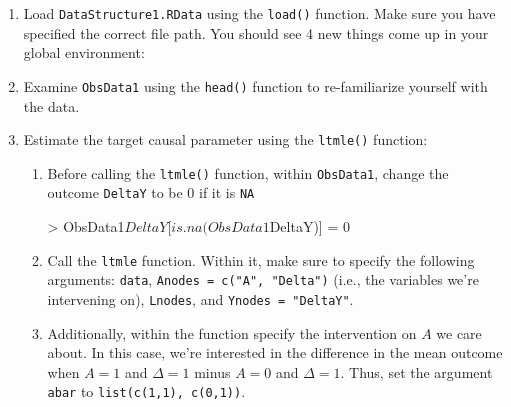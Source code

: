 \documentclass[answers]{exam}
\newenvironment{packed_item}{
\begin{itemize}
 \setlength{\itemsep}{0pt}
  \setlength{\parskip}{0pt}
  \setlength{\parsep}{0pt}
}{\end{itemize}}
\begin{document}
\begin{enumerate}
\item Load \texttt{DataStructure1.RData} using the \texttt{load()} function. Make sure you have specified the correct file path. You should see 4 new things come up in your global environment:
\item Examine \texttt{ObsData1} using the \texttt{head()} function to re-familiarize yourself with the data.
\item Estimate the target causal parameter using the \texttt{ltmle()} function:
\begin{enumerate}
\item Before calling the \texttt{ltmle()} function, within \texttt{ObsData1}, change the outcome \texttt{DeltaY} to be 0 if it is \texttt{NA}
\begin{Schunk}
\begin{Sinput}
> ObsData1$DeltaY[is.na(ObsData1$DeltaY)] = 0
\end{Sinput}
\end{Schunk}
\item Call the \texttt{ltmle} function. Within it, make sure to specify the following arguments: \texttt{data}, \texttt{Anodes = c("A", "Delta")} (i.e., the variables we're intervening on), \texttt{Lnodes}, and \texttt{Ynodes = "DeltaY"}.
\item Additionally, within the function specify the intervention on $A$ we care about. In this case, we're interested in the difference in the mean outcome when $A=1$ and $\Delta=1$ minus $A=0$ and $\Delta = 1$. Thus, set the argument \texttt{abar} to \texttt{list(c(1,1), c(0,1))}.

\end{enumerate}
\end{enumerate}
\end{document}
